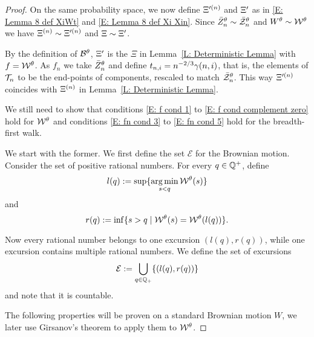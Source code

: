 \begin{proof}
	On the same probability space, we now define $\Xi^{\prime (n)}$ and $\Xi^{\prime}$ as in \eqref{E: Lemma 8 def XiWt} and \eqref{E: Lemma 8 def Xi Xin}.
	Since $\bar{Z}^{\theta}_n \sim \bar{\mathcal{Z}}^{\theta}_n$ and $W^{\theta} \sim \mathcal{W}^{\theta}$ we have $\Xi^{(n)} \sim \Xi^{\prime (n)}$ and $\Xi \sim \Xi^{\prime}$.
	
	By the definition of $\mathcal{B}^{\theta}$, 
	$\Xi^{\prime}$ is the $\Xi$ in Lemma~\ref{L: Deterministic Lemma} with $f = \mathcal{W}^{\theta}$.
	As $f_n$ we take $\bar{Z}^{\theta}_n$ and define $t_{n, i} = n^{-2 / 3} \gamma(n,i)$, that is, 
	the elements of $\mathcal{T}_n$ to be the end-points of components,
	rescaled to match $\bar{\mathcal{Z}}^{\theta}_n$.
	This way $\Xi^{\prime (n)}$ coincides with $\Xi^{(n)}$ in Lemma~\ref{L: Deterministic Lemma}.
	
	We still need to show that conditions \eqref{E: f cond 1} to \eqref{E: f cond complement zero} hold for $\mathcal{W}^{\theta}$
	and conditions \eqref{E: fn cond 3} to \eqref{E: fn cond 5} hold for the breadth-first walk.
	
	We start with the former. 
	We first define the set $\mathcal{E}$ for the Brownian motion.
	Consider the set of positive rational numbers.
	For every $q \in \mathbb{Q}^+$, 
	define 
	\begin{equation} \label{E: def l(q)}
		l(q) := \sup\{ \operatorname*{arg\,min}_{s < q} \mathcal{W}^{\theta}(s) \}
	\end{equation}
	and
	\begin{equation} \label{E: def r(q)}
		r(q) := \inf\{ {s > q \; | \; \mathcal{W}^{\theta}(s) = \mathcal{W}^{\theta}(l(q))} \}.
	\end{equation}
	
	Now every rational number belongs to one excursion $(l(q), r(q))$,
	while one excursion contains multiple rational numbers.
	We define the set of excursions
	\begin{equation}
	\mathcal{E} := \bigcup_{q \in \mathbb{Q}_+} \{ (l(q), r(q)) \}
	\end{equation}
	and note that it is countable.
	
	The following properties will be proven on a standard Brownian motion $W$,
	we later use Girsanov's theorem to apply them to $\mathcal{W}^{\theta}$.
	

\end{proof}
